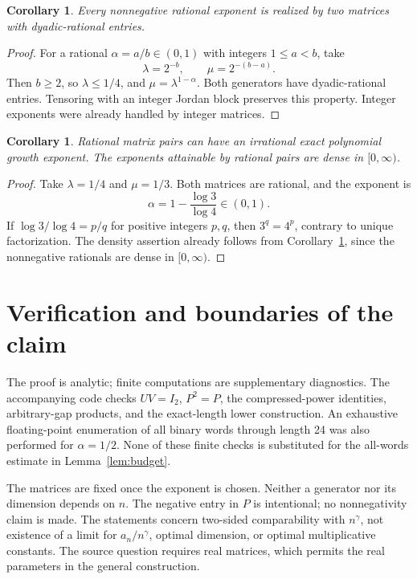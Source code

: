 \documentclass[11pt]{article}
\newtheorem{corollary}[theorem]{Corollary}
\theoremstyle{remark}\newtheorem{remark}[theorem]{Remark}
\begin{document}
\begin{corollary}\label{cor:rational}
Every nonnegative rational exponent is realized by two matrices with dyadic-rational entries.
\end{corollary}
\begin{proof}
For a rational $\alpha=a/b\in(0,1)$ with integers $1\leq a<b$, take
\[
 \lambda=2^{-b},\qquad \mu=2^{-(b-a)}.
\]
Then $b\geq2$, so $\lambda\leq1/4$, and $\mu=\lambda^{1-\alpha}$. Both generators have dyadic-rational entries. Tensoring with an integer Jordan block preserves this property. Integer exponents were already handled by integer matrices.
\end{proof}

\begin{corollary}\label{cor:irrational}
Rational matrix pairs can have an irrational exact polynomial growth exponent. The exponents attainable by rational pairs are dense in $[0,\infty)$.
\end{corollary}
\begin{proof}
Take $\lambda=1/4$ and $\mu=1/3$. Both matrices are rational, and the exponent is
\[
 \alpha=1-\frac{\log3}{\log4}\in(0,1).
\]
If $\log3/\log4=p/q$ for positive integers $p,q$, then $3^q=4^p$, contrary to unique factorization. The density assertion already follows from Corollary~\ref{cor:rational}, since the nonnegative rationals are dense in $[0,\infty)$.
\end{proof}

\section{Verification and boundaries of the claim}
The proof is analytic; finite computations are supplementary diagnostics. The accompanying code checks $UV=I_2$, $P^2=P$, the compressed-power identities, arbitrary-gap products, and the exact-length lower construction. An exhaustive floating-point enumeration of all binary words through length 24 was also performed for $\alpha=1/2$. None of these finite checks is substituted for the all-words estimate in Lemma~\ref{lem:budget}.

The matrices are fixed once the exponent is chosen. Neither a generator nor its dimension depends on $n$. The negative entry in $P$ is intentional; no nonnegativity claim is made. The statements concern two-sided comparability with $n^\gamma$, not existence of a limit for $a_n/n^\gamma$, optimal dimension, or optimal multiplicative constants. The source question requires real matrices, which permits the real parameters in the general construction.
\end{document}
